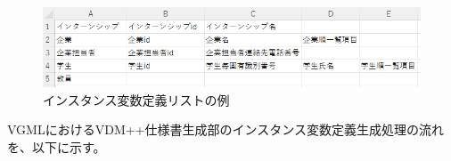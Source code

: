 \begin{figure}[t]
    \begin{center}
        \includegraphics[width=1.0\columnwidth]{image/instance_list.png}
        \caption{インスタンス変数定義リストの例}
        \label{fig:instance_list}
    \end{center}
\end{figure}

VGMLにおけるVDM++仕様書生成部のインスタンス変数定義生成処理の流れを、以下に示す。

